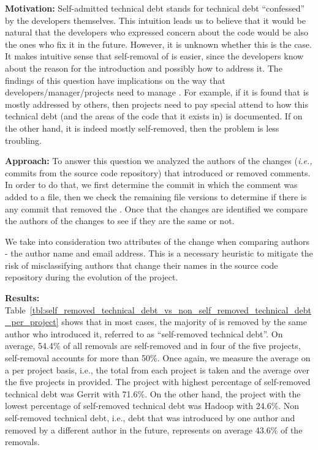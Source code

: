 \noindent \textbf{Motivation:} Self-admitted technical debt stands for technical debt ``confessed'' by the developers themselves. This intuition leads us to believe that it would be natural that the developers who expressed concern about the code would be also the ones who fix it in the future. However, it is unknown whether this is the case. It makes intuitive sense that self-removal of \SATD is easier, since the developers know about the reason for the \SATD introduction and possibly how to address it. The findings of this question have implications on the way that developers/manager/projects need to manage \SATD. For example, if it is found that \SATD is mostly addressed by others, then projects need to pay special attend to how this technical debt (and the areas of the code that it exists in) is documented. If on the other hand, it is indeed mostly self-removed, then the problem is less troubling.




\noindent \textbf{Approach:} To answer this question we analyzed the authors of the changes (\textit{i.e.,} commits from the source code repository) that introduced or removed \SATD comments. In order to do that, we first determine the commit in which the \SATD comment was added to a file, then we check the remaining file versions to determine if there is any commit that removed the \SATD. Once that the changes are identified we compare the authors of the changes to see if they are the same or not. 

We take into consideration two attributes of the change when comparing authors - the author name and email address. This is a necessary heuristic to mitigate the risk of misclassifying authors that change their names in the source code repository during the evolution of the project.  


\noindent \textbf{Results:} Table~\ref{tbl:self_removed_technical_debt_vs_non_self_removed_technical_debt_per_project} shows that in most cases, the majority of \SATD is removed by the same author who introduced it, referred to as ``self-removed technical debt''. On average, 54.4\% of all removals are self-removed and in four of the five projects, self-removal accounts for more than 50\%. Once again, we measure the average on a per project basis, i.e., the total from each project is taken and the average over the five projects in provided. The project with highest percentage of self-removed technical debt was Gerrit with 71.6\%. On the other hand, the project with the lowest percentage of self-removed technical debt was Hadoop with 24.6\%. Non self-removed technical debt, i.e., debt that was introduced by one author and removed by a different author in the future, represents on average 43.6\% of the removals. 

